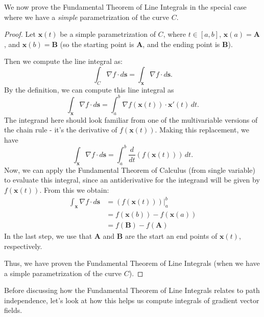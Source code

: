 \documentclass{ximera}
\begin{document}
We now prove the Fundamental Theorem of Line Integrals in the special case where we have a \emph{simple} parametrization of the curve $C$.

\begin{proof}
Let $\textbf{x}(t)$ be a simple parametrization of $C$, where $t\in[a,b]$, $\textbf{x}(a)=\textbf{A}$, and $\textbf{x}(b)=\textbf{B}$ (so the starting point is $\textbf{A}$, and the ending point is $\textbf{B}$).

Then we compute the line integral as:
\[
\int_C\nabla f\cdot d\textbf{s} = \int_\textbf{x}\nabla f\cdot d\textbf{s}.
\]
By the definition, we can compute this line integral as
\[
\int_\textbf{x}\nabla f\cdot d\textbf{s} = \int_a^b \nabla f(\textbf{x}(t))\cdot\textbf{x}'(t)\,dt.
\]
The integrand here should look familiar from one of the multivariable versions of the chain rule - it's the derivative of $f(\textbf{x}(t))$. Making this replacement, we have
\[
\int_\textbf{x}\nabla f\cdot d\textbf{s} = \int_a^b \frac{d}{dt}(f(\textbf{x}(t)))\,dt.
\]
Now, we can apply the Fundamental Theorem of Calculus (from single variable) to evaluate this integral, since an antiderivative for the integrand will be given by $f(\textbf{x}(t))$. From this we obtain:
\begin{align*}
\int_\textbf{x}\nabla f\cdot d\textbf{s} &= (f(\textbf{x}(t)))\vert_a^b\\
&= f(\textbf{x}(b))-f(\textbf{x}(a))\\
&= f(\textbf{B})-f(\textbf{A})
\end{align*}
In the last step, we use that $\textbf{A}$ and $\textbf{B}$ are the start an end points of $\textbf{x}(t)$, respectively.

Thus, we have proven the Fundamental Theorem of Line Integrals (when we have a simple parametrization of the curve $C$).
\end{proof}

Before discussing how the Fundamental Theorem of Line Integrals relates to path independence, let's look at how this helps us compute integrals of gradient vector fields.
\end{document}
